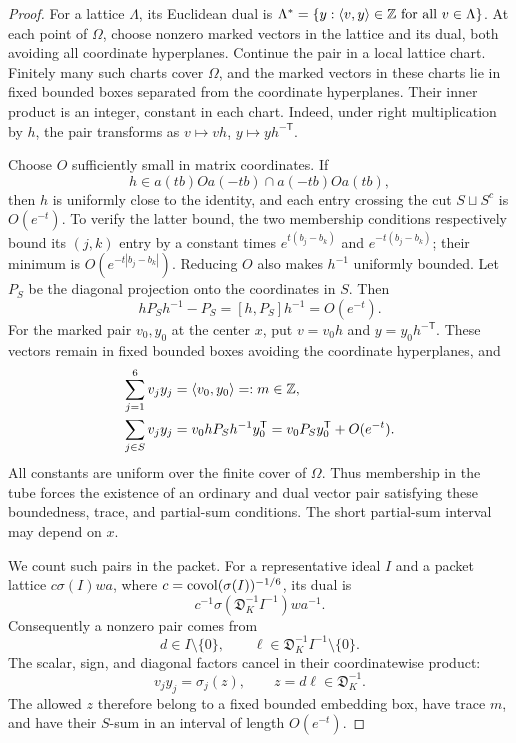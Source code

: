 \begin{proof}
For a lattice $\Lambda$, its Euclidean dual is
$\Lambda^*=\{y:\langle v,y\rangle\in\mathbb Z\text{ for all }v\in\Lambda\}$.
At each point of $\Omega$, choose nonzero marked vectors in the
lattice and its dual, both avoiding all coordinate hyperplanes.
Continue the pair in a local lattice chart.  Finitely many such
charts cover $\Omega$, and the marked vectors in these charts lie
in fixed bounded boxes separated from the coordinate hyperplanes.
Their inner product is an integer, constant in each chart.  Indeed,
under right multiplication by $h$, the pair transforms as
$v\mapsto vh$, $y\mapsto yh^{-\mathsf T}$.

Choose $O$ sufficiently small in matrix coordinates.  If
\[
 h\in a(tb)Oa(-tb)\cap a(-tb)Oa(tb),
\]
then $h$ is uniformly close to the identity, and each entry crossing
the cut $S\sqcup S^c$ is $O(e^{-t})$.  To verify the latter bound,
the two membership conditions respectively bound its $(j,k)$ entry
by a constant times $e^{t(b_j-b_k)}$ and $e^{-t(b_j-b_k)}$;
their minimum is $O(e^{-t|b_j-b_k|})$.  Reducing $O$ also makes
$h^{-1}$ uniformly bounded.  Let $P_S$ be the diagonal projection
onto the coordinates in $S$.  Then
\[
 hP_Sh^{-1}-P_S=[h,P_S]h^{-1}=O(e^{-t}).
\]
For the marked pair $v_0,y_0$ at the center $x$, put
$v=v_0h$ and $y=y_0h^{-\mathsf T}$.  These vectors remain in fixed
bounded boxes avoiding the coordinate hyperplanes, and
\begin{align*}
 \sum_{j=1}^6v_jy_j&=\langle v_0,y_0\rangle=:m\in\mathbb Z,\\
 \sum_{j\in S}v_jy_j
   &=v_0hP_Sh^{-1}y_0^{\mathsf T}
     =v_0P_Sy_0^{\mathsf T}+O(e^{-t}).
\end{align*}
All constants are uniform over the finite cover of $\Omega$.
Thus membership in the tube forces the existence of an ordinary
and dual vector pair satisfying these boundedness, trace, and
partial-sum conditions.  The short partial-sum interval may depend
on $x$.

We count such pairs in the packet.  For a representative ideal $I$
and a packet lattice $c\sigma(I)wa$, where
$c=\operatorname{covol}(\sigma(I))^{-1/6}$, its dual is
\[
 c^{-1}\sigma(\mathfrak D_K^{-1}I^{-1})wa^{-1}.
\]
Consequently a nonzero pair comes from
\[
 d\in I\setminus\{0\},\qquad
 \ell\in\mathfrak D_K^{-1}I^{-1}\setminus\{0\}.
\]
The scalar, sign, and diagonal factors cancel in their
coordinatewise product:
\begin{equation}
 v_jy_j=\sigma_j(z),\qquad z=d\ell\in\mathfrak D_K^{-1}.
                                                        \label{eq:pair-product}
\end{equation}
The allowed $z$ therefore belong to a fixed bounded embedding box,
have trace $m$, and have their $S$-sum in an interval of length
$O(e^{-t})$.


\end{proof}
